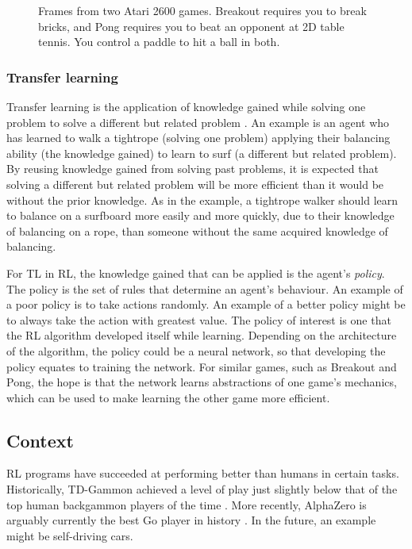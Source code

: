 \documentclass[12pt,a4paper]{article}
\begin{document}
\begin{figure}[!tbp]
    \centering
    \hfill
    \caption{Frames from two Atari 2600 games. Breakout requires you to break bricks, and Pong requires you to beat an opponent at 2D table tennis. You control a paddle to hit a ball in both.}
\end{figure}

\subsubsection{Transfer learning}
Transfer learning is the application of knowledge gained while solving one problem to solve a different but related problem \cite{2010}. An example is an agent who has learned to walk a tightrope (solving one problem) applying their balancing ability (the knowledge gained) to learn to surf (a different but related problem). By reusing knowledge gained from solving past problems, it is expected that solving a different but related problem will be more efficient than it would be without the prior knowledge. As in the example, a tightrope walker should learn to balance on a surfboard more easily and more quickly, due to their knowledge of balancing on a rope, than someone without the same acquired knowledge of balancing. 

For TL in RL, the knowledge gained that can be applied is the agent's \emph{policy}. The policy is the set of rules that determine an agent's behaviour. An example of a poor policy is to take actions randomly. An example of a better policy might be to always take the action with greatest value. The policy of interest is one that the RL algorithm developed itself while learning. Depending on the architecture of the algorithm, the policy could be a neural network, so that developing the policy equates to training the network. For similar games, such as Breakout and Pong, the hope is that the network learns abstractions of one game's mechanics, which can be used to make learning the other game more efficient.

\subsection{Context}
RL programs have succeeded at performing better than humans in certain tasks. Historically, TD-Gammon achieved a level of play just slightly below that of the top human backgammon players of the time \cite{}. More recently, AlphaZero is arguably currently the best Go player in history \cite{}. In the future, an example might be self-driving cars.
\end{document}
